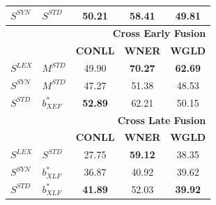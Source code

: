 \begin{table}[!tb]
\begin{tabular}{@{}llccc@{}}
$S^{\scriptscriptstyle SYN}$ & $S^{\scriptscriptstyle STD}$ & 50.21                      & 58.41                     & \textbf{49.81}                     \\
\midrule
          &           & \multicolumn{3}{r}{\textbf{Cross Early Fusion}} \\
\midrule
          &           & \textbf{CONLL}                      & \textbf{WNER}                      & \textbf{WGLD}                      \\ \cmidrule{3-5}
$S^{\scriptscriptstyle LEX}$ &$M^{\scriptscriptstyle STD}$        & 49.90                      & \textbf{70.27}                     & \textbf{62.69}                    \\
$S^{\scriptscriptstyle SYN}$ & $M^{\scriptscriptstyle STD}$ & 47.27                      & 51.38                     & 48.53                     \\
$S^{\scriptscriptstyle STD}$ & ${b}^*_{\scriptscriptstyle XEF}$        & \textbf{52.89}                      & 62.21                     & 50.15                     \\
\midrule
          &           & \multicolumn{3}{r}{\textbf{Cross Late Fusion}}  \\
\midrule
          &           & \textbf{CONLL}                      & \textbf{WNER}                      & \textbf{WGLD}                      \\ \cmidrule{3-5}
$S^{\scriptscriptstyle LEX}$ & $S^{\scriptscriptstyle STD}$ & 27.75                      & \textbf{59.12}                     & 38.35                     \\
$S^{\scriptscriptstyle SYN}$ & ${b}_{\scriptscriptstyle XLF}^{*}$       & 36.87                      & 40.92                     & 39.62                     \\
$S^{\scriptscriptstyle STD}$ & ${b}_{\scriptscriptstyle XLF}^{*}$        & \textbf{41.89}                      & 52.03                     & \textbf{39.92}                     \\ \bottomrule
\end{tabular}
\end{table}


